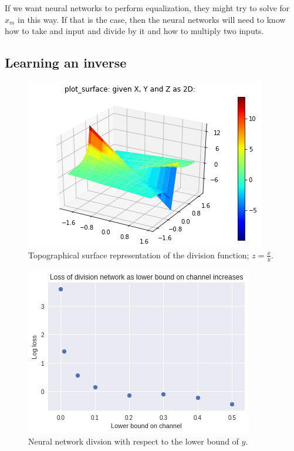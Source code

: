 If we want neural networks to perform equalization, they might try to solve for $\hat{x}_m$ in this way.  
If that is the case, then the neural networks will need to know how to take and input and divide by it and how to multiply two inputs.  

\subsection{Learning an inverse}

\begin{figure}
\begin{center}
\includegraphics{figures/equal/Division_Function_plot.png}
\caption{Topographical surface representation of the division function; $z=\frac{x}{y}$.}
\label{fig:div_fx}
\end{center}
\end{figure}

\begin{figure}
\begin{center}
\includegraphics{figures/equal/Channel_lower_bound_division.png}
\caption{Neural network divsion with respect to the lower bound of $y$.}
\label{fig:one_tap_inv}
\end{center}
\end{figure}

